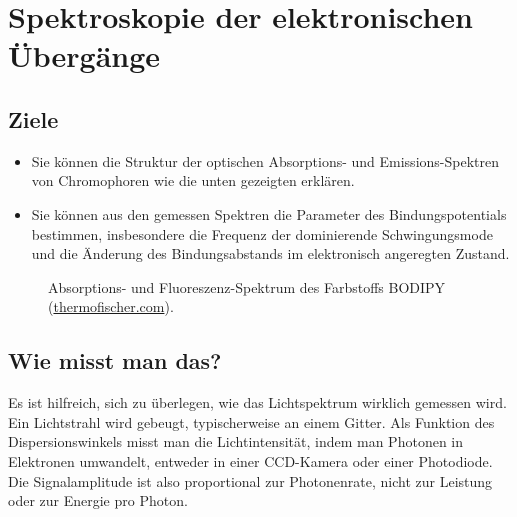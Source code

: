 
\chapter{Spektroskopie der elektronischen Übergänge}





\section{Ziele}

\begin{itemize}
\item Sie können die Struktur der optischen Absorptions- und Emissions-Spektren von Chromophoren wie die unten gezeigten erklären.

\item Sie können aus den gemessen Spektren die Parameter des Bindungspotentials bestimmen, insbesondere die Frequenz der dominierende Schwingungsmode und die Änderung des Bindungsabstands im elektronisch angeregten Zustand.

\end{itemize}


\begin{figure}
  \caption{Absorptions- und Fluoreszenz-Spektrum des Farbstoffs BODIPY  (\href{https://www.thermofisher.com/de/de/home/life-science/cell-analysis/labeling-chemistry/fluorescence-spectraviewer.html?SID=srch-svtool&UID=10001moh}{thermofischer.com}).}
\end{figure}




\section{Wie misst man das?}


Es ist hilfreich, sich zu überlegen, wie das Lichtspektrum wirklich gemessen wird. Ein Lichtstrahl wird gebeugt, typischerweise an einem Gitter. Als Funktion des Dispersionswinkels misst man die Lichtintensität, indem man Photonen in Elektronen umwandelt, entweder in einer CCD-Kamera oder einer Photodiode. Die Signalamplitude ist also proportional zur Photonenrate, nicht zur Leistung oder zur Energie pro Photon.


